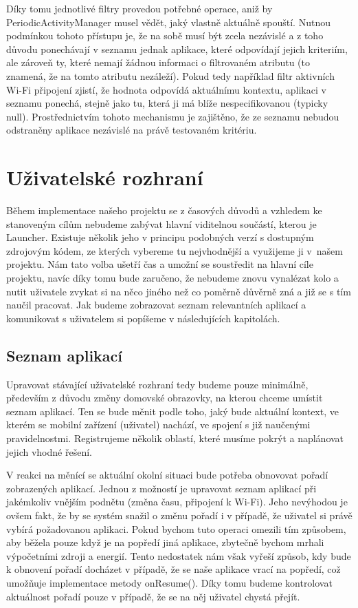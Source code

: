 \documentclass[thesis=M,czech]{FITthesis}[2012/06/26]
\begin{document}
Díky tomu jednotlivé filtry provedou potřebné operace, aniž by PeriodicActivityManager musel vědět, jaký vlastně aktuálně spouští. Nutnou podmínkou tohoto přístupu je, že na sobě musí být zcela nezávislé a z toho důvodu ponechávají v seznamu jednak aplikace, které odpovídají jejich kriteriím, ale zároveň ty, které nemají žádnou informaci o filtrovaném atributu (to znamená, že na tomto atributu nezáleží). Pokud tedy například filtr aktivních Wi-Fi připojení zjistí, že hodnota odpovídá aktuálnímu kontextu, aplikaci v seznamu ponechá, stejně jako tu, která ji má blíže nespecifikovanou (typicky null). Prostřednictvím tohoto mechanismu je zajištěno, že ze seznamu nebudou odstraněny aplikace nezávislé na právě testovaném kritériu.

\section{Uživatelské rozhraní}
Během implementace našeho projektu se z časových důvodů a vzhledem ke stanoveným cílům nebudeme zabývat hlavní viditelnou součástí, kterou je Launcher. Existuje několik jeho v principu podobných verzí s dostupným zdrojovým kódem, ze kterých vybereme tu nejvhodnější a využijeme ji v~našem projektu. Nám tato volba ušetří čas a umožní se soustředit na hlavní cíle projektu, navíc díky tomu bude zaručeno, že nebudeme znovu vynalézat kolo a nutit uživatele zvykat si na něco jiného než co poměrně důvěrně zná a již se s tím naučil pracovat. Jak budeme zobrazovat seznam relevantních aplikací a komunikovat s uživatelem si popíšeme v následujících kapitolách.

\subsection{Seznam aplikací}\label{app_list}
Upravovat stávající uživatelské rozhraní tedy budeme pouze minimálně, především z důvodu změny domovské obrazovky, na kterou chceme umístit seznam aplikací. Ten se bude měnit podle toho, jaký bude aktuální kontext, ve kterém se mobilní zařízení (uživatel) nachází, ve spojení s již naučenými pravidelnostmi. Registrujeme několik oblastí, které musíme pokrýt a naplánovat jejich vhodné řešení.

V reakci na měnící se aktuální okolní situaci bude potřeba obnovovat pořadí zobrazených aplikací. Jednou z možností je upravovat seznam aplikací při jakémkoliv vnějším podnětu (změna času, připojení k Wi-Fi). Jeho nevýhodou je ovšem fakt, že by se systém snažil o změnu pořadí i v případě, že uživatel si právě vybírá požadovanou aplikaci. Pokud bychom tuto operaci omezili tím způsobem, aby běžela pouze když je na popředí jiná aplikace, zbytečně bychom mrhali výpočetními zdroji a energií. Tento nedostatek nám však vyřeší způsob, kdy bude k obnovení pořadí docházet v případě, že se naše aplikace vrací na popředí, což umožňuje implementace metody onResume(). Díky tomu budeme kontrolovat aktuálnost pořadí pouze v případě, že se na něj uživatel chystá přejít.
\end{document}
